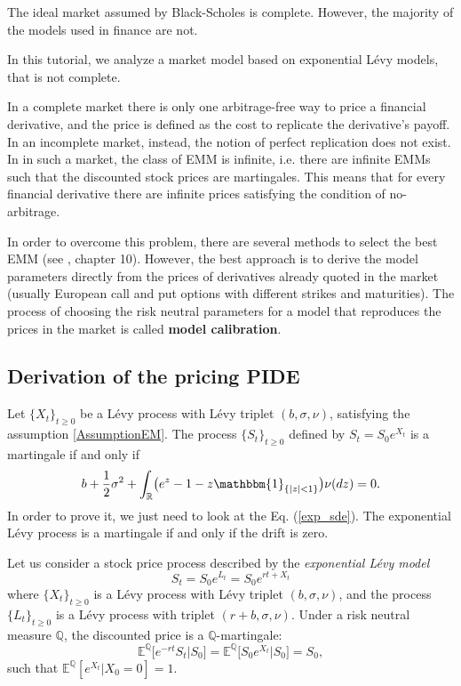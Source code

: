 \documentclass[a4paper,10pt]{article}
\newcommand{\numberset}{\mathbb}
\newcommand{\R}{\numberset{R}}
\newcommand{\E}{\numberset{E}}
\newcommand{\Q}{\numberset{Q}}
\begin{document}
The ideal market assumed by Black-Scholes is complete. 
However, the majority of the models used in finance are not.

In this tutorial, we analyze a market model based on exponential Lévy models, that is not complete. 

In a complete market there is only one arbitrage-free way to price a financial derivative, and the price is defined as the cost to replicate the derivative's payoff.
In an incomplete market, instead, the notion of perfect replication does not exist. 
In in such a market, the class of EMM is infinite, 
i.e. there are infinite EMMs such that the discounted stock prices are martingales.
This means that for every financial derivative there are infinite prices satisfying the condition of no-arbitrage. 

In order to overcome this problem, there are several methods to select the best EMM (see \cite{Cont}, chapter 10).
However, the best approach is to derive the model parameters directly from the prices of derivatives 
already quoted in the market (usually European call and put options with different strikes and maturities).
The process of choosing the risk neutral parameters for a model that reproduces the prices in the market is called \textbf{model calibration}.


\subsection{Derivation of the pricing PIDE}


Let $\{X_t\}_{t\geq0}$ be a Lévy process with Lévy triplet $(b,\sigma,\nu)$, satisfying the assumption \ref{AssumptionEM}. 
The process $\{S_t\}_{t\geq0}$ defined by $S_t = S_0 e^{X_t}$ is a martingale if and only if
\begin{equation}\label{martingale_b}
  b +\frac{1}{2} \sigma^2  + \int_{\R} \bigl( e^z-1 -z\mathbbm{1}_{\{ |z|<1 \}} \bigr) \nu(dz) = 0.
\end{equation}
In order to prove it, we just need to look at the Eq. (\ref{exp_sde}). The exponential Lévy process is a martingale if and only if the drift is zero.

Let us consider a stock price process described by the \emph{exponential Lévy model}
\begin{equation}\label{ELM2}
 S_t = S_0 e^{L_t} = S_0 e^{rt + X_t}
\end{equation}
where $\{X_t\}_{t\geq 0}$ is a Lévy process with Lévy triplet $(b,\sigma,\nu)$, and the process $\{L_t\}_{t\geq 0}$ 
is a Lévy process with triplet $(r+b,\sigma,\nu)$. 
Under a risk neutral measure $\Q$, the discounted price is a $\Q$-martingale:
\begin{equation}
 \E^{\Q} \bigl[ e^{-rt} S_t \bigr| S_0 \bigr] =  \E^{\Q} \bigl[ S_0e^{X_t} \bigr| S_0 \bigr] = S_0, 
\end{equation}
such that $\E^{\Q}[ e^{X_t} | X_0=0] = 1 $. 
\end{document}
